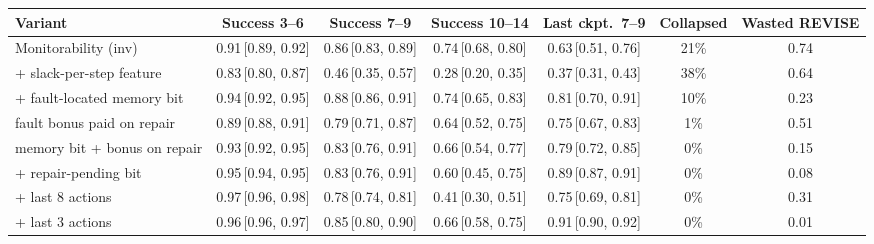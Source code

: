 \begin{tabular}{lcccccc}
\toprule
Variant & Success 3--6 & Success 7--9 & Success 10--14 & Last ckpt.\ 7--9 & Collapsed & Wasted REVISE \\
\midrule
Monitorability (inv) & 0.91\,{\scriptsize[0.89, 0.92]} & 0.86\,{\scriptsize[0.83, 0.89]} & 0.74\,{\scriptsize[0.68, 0.80]} & 0.63\,{\scriptsize[0.51, 0.76]} & 21\% & 0.74 \\
+ slack-per-step feature & 0.83\,{\scriptsize[0.80, 0.87]} & 0.46\,{\scriptsize[0.35, 0.57]} & 0.28\,{\scriptsize[0.20, 0.35]} & 0.37\,{\scriptsize[0.31, 0.43]} & 38\% & 0.64 \\
+ fault-located memory bit & 0.94\,{\scriptsize[0.92, 0.95]} & 0.88\,{\scriptsize[0.86, 0.91]} & 0.74\,{\scriptsize[0.65, 0.83]} & 0.81\,{\scriptsize[0.70, 0.91]} & 10\% & 0.23 \\
fault bonus paid on repair & 0.89\,{\scriptsize[0.88, 0.91]} & 0.79\,{\scriptsize[0.71, 0.87]} & 0.64\,{\scriptsize[0.52, 0.75]} & 0.75\,{\scriptsize[0.67, 0.83]} & 1\% & 0.51 \\
memory bit + bonus on repair & 0.93\,{\scriptsize[0.92, 0.95]} & 0.83\,{\scriptsize[0.76, 0.91]} & 0.66\,{\scriptsize[0.54, 0.77]} & 0.79\,{\scriptsize[0.72, 0.85]} & 0\% & 0.15 \\
+ repair-pending bit & 0.95\,{\scriptsize[0.94, 0.95]} & 0.83\,{\scriptsize[0.76, 0.91]} & 0.60\,{\scriptsize[0.45, 0.75]} & 0.89\,{\scriptsize[0.87, 0.91]} & 0\% & 0.08 \\
+ last 8 actions & 0.97\,{\scriptsize[0.96, 0.98]} & 0.78\,{\scriptsize[0.74, 0.81]} & 0.41\,{\scriptsize[0.30, 0.51]} & 0.75\,{\scriptsize[0.69, 0.81]} & 0\% & 0.31 \\
+ last 3 actions & 0.96\,{\scriptsize[0.96, 0.97]} & 0.85\,{\scriptsize[0.80, 0.90]} & 0.66\,{\scriptsize[0.58, 0.75]} & 0.91\,{\scriptsize[0.90, 0.92]} & 0\% & 0.01 \\
\bottomrule
\end{tabular}
